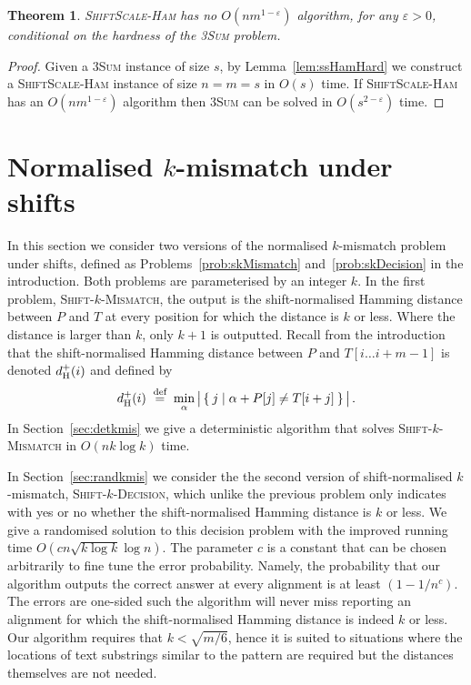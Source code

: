 \documentclass[11pt]{article}
\renewcommand{\epsilon}{\varepsilon}
\newcommand{\upto}{\ldots}
\newcommand{\DsHam}{\ensuremath{d_\textup{H}^+}}
\newcommand{\ssHam}{\textsc{ShiftScale-Ham}\xspace}
\newcommand{\skMismatch}{\textsc{Shift-$k$-Mismatch}\xspace}
\newcommand{\skDecision}{\textsc{Shift-$k$-Decision}\xspace}
\newcommand{\dHam}{\DsHam}
\newcommand{\threeSUM}{\textsc{3Sum}\xspace}
\theoremstyle{plain}
\newtheorem{theorem}{Theorem}[]
\theoremstyle{definition}
\begin{document}
\begin{theorem}
    \label{thm:ssHamLower}
    \ssHam has no $O(nm^{1-\epsilon})$ algorithm, for any $\epsilon>0$, conditional on the hardness of the \threeSUM problem.
\end{theorem}
\begin{proof}
    Given a \threeSUM instance of size $s$, by Lemma~\ref{lem:ssHamHard} we construct a \ssHam instance of size $n=m=s$ in $O(s)$ time. If \ssHam has an $O(nm^{1-\epsilon})$ algorithm then \threeSUM can be solved in $O(s^{2-\epsilon})$ time.
\end{proof}



\section{Normalised $k$-mismatch under shifts}\label{sec:TIk}

In this section we consider two versions of the normalised $k$-mismatch problem under shifts, defined as Problems~\ref{prob:skMismatch} and~\ref{prob:skDecision} in the introduction. Both problems are parameterised by an integer $k$. In the first problem, \skMismatch, the output is the shift-normalised Hamming distance between $P$ and $T$ at every position for which the distance is $k$ or less. Where the distance is larger than $k$, only $k+1$ is outputted. Recall from the introduction that the shift-normalised Hamming distance between $P$ and $T[i\upto i+m-1]$ is denoted $\DsHam(i)$ and defined by
\begin{equation*}
        \dHam(i) \eqdef \min_{\alpha} \big| \Set{j | \alpha + P[j] \neq T[i+j]} \big| \,.
\end{equation*}
In Section~\ref{sec:detkmis} we give a deterministic algorithm that solves \skMismatch in $O(nk \log k)$ time.

In Section~\ref{sec:randkmis} we consider the the second version of shift-normalised $k$-mismatch, \skDecision, which unlike the previous problem only indicates with yes or no whether the shift-normalised Hamming distance is $k$ or less. We give a randomised solution to this decision problem with the improved running time $O(cn \sqrt{k \log k} \log n)$. The parameter $c$ is a constant that can be chosen arbitrarily to fine tune the error probability. Namely, the probability that our algorithm outputs the correct answer at every alignment is at least $(1-1/n^c)$. The errors are one-sided such the algorithm will never miss reporting an alignment for which the shift-normalised Hamming distance is indeed $k$ or less. Our algorithm requires that $k<\sqrt{m/6}$, hence it is suited to situations where the locations of text substrings similar to the pattern are required but the distances themselves are not needed.
\end{document}
